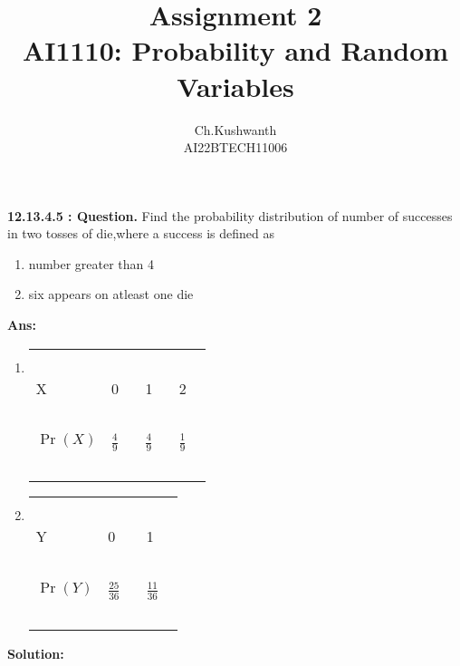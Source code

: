 \documentclass[journal,12pt,onecolumn]{IEEEtran}
\title{\textbf{Assignment 2}
\\ \textbf{AI1110:} Probability and Random Variables}
\author{Ch.Kushwanth
\\ AI22BTECH11006}
\providecommand{\pr}[1]{\ensuremath{\Pr\left(#1\right)}}
\theoremstyle{remark}
\begin{document}
\maketitle
\textbf{12.13.4.5 : Question.}
Find the probability \mbox{distribution} of number of successes in two tosses of die,where a success is defined as
\begin{enumerate}
\item number greater than 4
\item six appears on atleast one die
\end{enumerate}
\textbf{Ans:}
\begin{enumerate}
\item 
\begin{tabular}{|l|l|l|l|}
\hline 
\ & \ & \ & \\
\Large X & \Large 0 \  & \Large 1 \  & \Large 2 \ \\
\hline 
\ & \ & \ & \\
 \Large $\pr{X}$ &  \Large $\frac{4}{9}$ \  &  \Large $\frac{4}{9}$ \  &\Large $\frac{1}{9}$ \ \\
 \ & \ & \ & \\
\hline
\end{tabular}
\item
\begin{tabular}{|l|l|l|}
\hline 
\ & \ & \ \\
\Large Y & \Large 0 \  & \Large 1 \ \\
\hline 
\ & \ & \ \\
 \Large $\pr{Y}$ &  \Large $\frac{25}{36}$ \  &  \Large $\frac{11}{36}$ \  \\
 \ & \ & \ \\
\hline
\end{tabular}
\end{enumerate}
 \textbf{Solution:}
\end{document}
